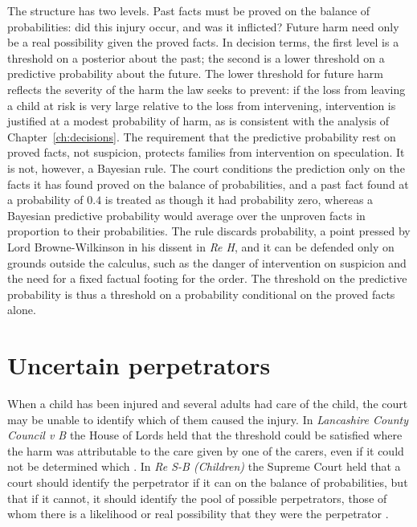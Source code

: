The structure has two levels. Past facts must be proved on the balance of probabilities: did this injury occur, and was it inflicted? Future harm need only be a real possibility given the proved facts. In decision terms, the first level is a threshold on a posterior about the past; the second is a lower threshold on a predictive probability about the future. The lower threshold for future harm reflects the severity of the harm the law seeks to prevent: if the loss from leaving a child at risk is very large relative to the loss from intervening, intervention is justified at a modest probability of harm, as is consistent with the analysis of Chapter~\ref{ch:decisions}. The requirement that the predictive probability rest on proved facts, not suspicion, protects families from intervention on speculation. It is not, however, a Bayesian rule. The court conditions the prediction only on the facts it has found proved on the balance of probabilities, and a past fact found at a probability of $0.4$ is treated as though it had probability zero, whereas a Bayesian predictive probability would average over the unproven facts in proportion to their probabilities. The rule discards probability, a point pressed by Lord Browne-Wilkinson in his dissent in \emph{Re H}, and it can be defended only on grounds outside the calculus, such as the danger of intervention on suspicion and the need for a fixed factual footing for the order. The threshold on the predictive probability is thus a threshold on a probability conditional on the proved facts alone.

\section{Uncertain perpetrators}

When a child has been injured and several adults had care of the child, the court may be unable to identify which of them caused the injury. In \emph{Lancashire County Council v B} the House of Lords held that the threshold could be satisfied where the harm was attributable to the care given by one of the carers, even if it could not be determined which \citep{lancashire2000}. In \emph{Re S-B (Children)} the Supreme Court held that a court should identify the perpetrator if it can on the balance of probabilities, but that if it cannot, it should identify the pool of possible perpetrators, those of whom there is a likelihood or real possibility that they were the perpetrator \citep{resb2009}.

